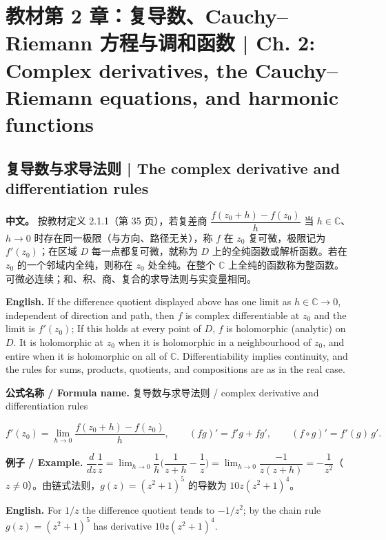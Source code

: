\documentclass[UTF8,11pt,a4paper]{ctexart}
\newcommand{\EN}[1]{\par\noindent \textbf{English.} #1\par}
\newcommand{\FORMULA}[2]{\par\noindent\textbf{公式名称 / Formula name.} #1 / #2\par}
\newcommand{\EX}[2]{\par\noindent \textbf{例子 / Example.} #1\par\EN{#2}}
\newcommand{\APS}[2]{\par\noindent\textbf{中文。} #1\par\noindent\textbf{English.} #2\par\smallskip}
\begin{document}
\section[教材第 2 章 全纯性]{教材第 2 章：复导数、Cauchy--Riemann 方程与调和函数 | Ch. 2: Complex derivatives, the Cauchy--Riemann equations, and harmonic functions}

\subsection{复导数与求导法则 | The complex derivative and differentiation rules}
\APS{按教材定义 2.1.1（第 35 页），若复差商 $\dfrac{f(z_0+h)-f(z_0)}{h}$ 当 $h\in\mathbb C$、$h\to0$ 时存在同一极限（与方向、路径无关），称 $f$ 在 $z_0$ 复可微，极限记为 $f'(z_0)$；在区域 $D$ 每一点都复可微，就称为 $D$ 上的全纯函数或解析函数。若在 $z_0$ 的一个邻域内全纯，则称在 $z_0$ 处全纯。在整个 $\mathbb C$ 上全纯的函数称为整函数。可微必连续；和、积、商、复合的求导法则与实变量相同。}{If the difference quotient displayed above has one limit as $h\in\mathbb C\to0$, independent of direction and path, then $f$ is complex differentiable at $z_0$ and the limit is $f'(z_0)$; If this holds at every point of $D$, $f$ is holomorphic (analytic) on $D$. It is holomorphic at $z_0$ when it is holomorphic in a neighbourhood of $z_0$, and entire when it is holomorphic on all of $\mathbb C$. Differentiability implies continuity, and the rules for sums, products, quotients, and compositions are as in the real case.}
\FORMULA{复导数与求导法则}{complex derivative and differentiation rules}
\[
f'(z_0)=\lim_{h\to0}\frac{f(z_0+h)-f(z_0)}{h},\qquad
(fg)'=f'g+fg',\qquad (f\circ g)'=f'(g)\,g'.
\]
\EX{$\dfrac{d}{dz}\dfrac1z=\lim_{h\to0}\dfrac{1}{h}\Big(\dfrac1{z+h}-\dfrac1z\Big)=\lim_{h\to0}\dfrac{-1}{z(z+h)}=-\dfrac1{z^2}$（$z\ne0$）。由链式法则，$g(z)=(z^2+1)^5$ 的导数为 $10z(z^2+1)^4$。}{For $1/z$ the difference quotient tends to $-1/z^2$; by the chain rule $g(z)=(z^2+1)^5$ has derivative $10z(z^2+1)^4$.}
\end{document}
